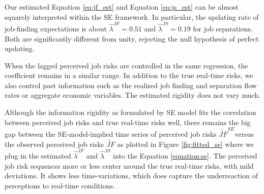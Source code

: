 Our estimated Equation \ref{eq:jf_est} and Equation \ref{eq:js_est} can be almost squarely interpreted within the SE framework. In particular, the updating rate of job-finding expectations is about $\widehat\lambda^{JF} = 0.51$ and $\widehat\lambda^{JS} = 0.19$ for job separations. Both are significantly different from unity, rejecting the null hypothesis of perfect updating. 

When the lagged perceived job risks are controlled in the same regression, the coefficient remains in a similar range. In addition to the true real-time risks, we also control past information such as the realized job finding and separation flow rates or aggregate economic variables. The estimated rigidity does not vary much.

Although the information rigidity as formulated by SE model fits the correlation between perceived job risks and true real-time risks well, there remains the big gap between the SE-model-implied time series of perceived job risks $\widetilde{JF}^{SE}$versus the observed perceived job risks $\widetilde{JF}$ as plotted in Figure \ref{fig:fitted_se} where we plug in the estimated $\hat \lambda^{JF}$ and $\hat \lambda^{JS}$ into the Equation \ref{equation:se}. The perceived job risk sequences more or less center around the true real-time risks, with mild deviations. It shows less time-variations, which does capture the underreaction of perceptions to real-time conditions. 

